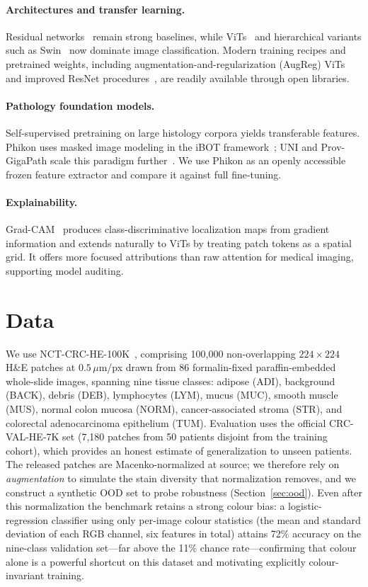 \documentclass[11pt]{article}
\begin{document}
\paragraph{Architectures and transfer learning.}
Residual networks~\citep{he2016deep} remain strong baselines, while
ViTs~\citep{dosovitskiy2021image} and hierarchical variants such as Swin~\citep{liu2021swin} now
dominate image classification. Modern training recipes and pretrained weights, including
augmentation-and-regularization (AugReg) ViTs~\citep{steiner2022how} and improved ResNet
procedures~\citep{wightman2021resnet}, are readily available through open libraries.

\paragraph{Pathology foundation models.}
Self-supervised pretraining on large histology corpora yields transferable features. Phikon uses
masked image modeling in the iBOT framework~\citep{zhou2022ibot,filiot2023scaling}; UNI and
Prov-GigaPath scale this paradigm further~\citep{chen2024uni,xu2024gigapath}. We use Phikon as an
openly accessible frozen feature extractor and compare it against full fine-tuning.

\paragraph{Explainability.}
Grad-CAM~\citep{selvaraju2017gradcam} produces class-discriminative localization maps from gradient
information and extends naturally to ViTs by treating patch tokens as a spatial grid. It offers
more focused attributions than raw attention for medical imaging, supporting model auditing.

\section{Data}
We use NCT-CRC-HE-100K~\citep{kather2019predicting,kather2018dataset}, comprising 100{,}000
non-overlapping $224\times224$ H\&E patches at $0.5\,\mu$m/px drawn from 86 formalin-fixed
paraffin-embedded whole-slide images, spanning nine tissue classes: adipose (ADI), background
(BACK), debris (DEB), lymphocytes (LYM), mucus (MUC), smooth muscle (MUS), normal colon mucosa
(NORM), cancer-associated stroma (STR), and colorectal adenocarcinoma epithelium (TUM). Evaluation
uses the official CRC-VAL-HE-7K set (7{,}180 patches from 50 patients disjoint from the training
cohort), which provides an honest estimate of generalization to unseen patients. The released
patches are Macenko-normalized at source; we therefore rely on \emph{augmentation} to simulate the
stain diversity that normalization removes, and we construct a synthetic OOD set to probe
robustness (Section~\ref{sec:ood}). Even after this normalization the benchmark retains a strong
colour bias: a logistic-regression classifier using only per-image colour statistics (the mean and
standard deviation of each RGB channel, six features in total) attains 72\% accuracy on the
nine-class validation set---far above the 11\% chance rate---confirming that colour alone is a
powerful shortcut on this dataset and motivating explicitly colour-invariant training.
\end{document}
